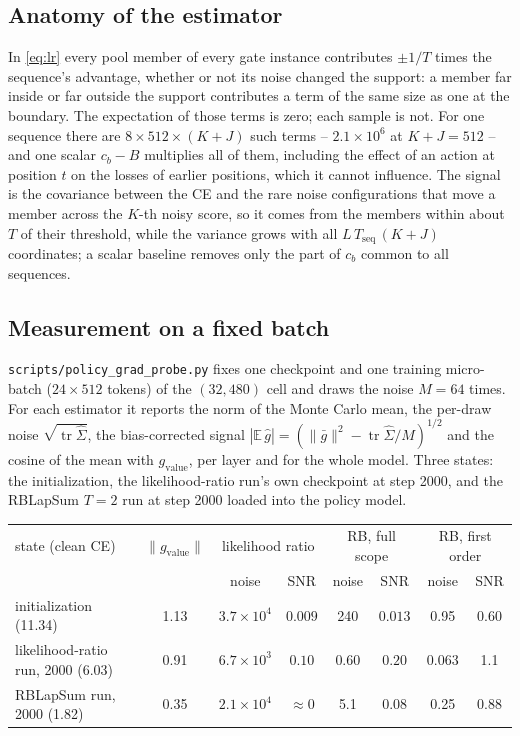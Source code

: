 \documentclass[11pt,a4paper]{article}
\newcommand{\code}[1]{\texttt{#1}}
\begin{document}
\subsection*{Anatomy of the estimator}

In \eqref{eq:lr} every pool member of every gate instance contributes
$\pm 1/T$ times the sequence's advantage, whether or not its noise changed the
support: a member far inside or far outside the support contributes a term of
the same size as one at the boundary. The expectation of those terms is zero;
each sample is not. For one sequence there are $8 \times 512 \times (K{+}J)$
such terms -- $2.1 \times 10^6$ at $K{+}J = 512$ -- and one scalar
$c_b - B$ multiplies all of them, including the effect of an action at
position $t$ on the losses of earlier positions, which it cannot influence.
The signal is the covariance between the CE and the rare noise configurations
that move a member across the $K$-th noisy score, so it comes from the members
within about $T$ of their threshold, while the variance grows with all
$L\,T_{\mathrm{seq}}\,(K{+}J)$ coordinates; a scalar baseline removes only the
part of $c_b$ common to all sequences.

\subsection*{Measurement on a fixed batch}

\code{scripts/policy\_grad\_probe.py} fixes one checkpoint and one training
micro-batch ($24 \times 512$ tokens) of the $(32, 480)$ cell and draws the
noise $M = 64$ times. For each estimator it reports the norm of the Monte Carlo
mean, the per-draw noise $\sqrt{\operatorname{tr}\widehat\Sigma}$, the
bias-corrected signal $|\mathbb E\,\hat g| = (\|\bar g\|^2 -
\operatorname{tr}\widehat\Sigma / M)^{1/2}$ and the cosine of the mean with
$g_{\mathrm{value}}$, per layer and for the whole model. Three states: the
initialization, the likelihood-ratio run's own checkpoint at step 2000, and the
RBLapSum $T=2$ run at step 2000 loaded into the policy model.

\begin{center}\small
\begin{tabular}{lccccccc}
\toprule
state (clean CE) & $\|g_{\mathrm{value}}\|$ & \multicolumn{2}{c}{likelihood ratio} &
\multicolumn{2}{c}{RB, full scope} & \multicolumn{2}{c}{RB, first order} \\
 & & noise & SNR & noise & SNR & noise & SNR \\
\midrule
initialization (11.34)        & 1.13  & $3.7 \times 10^4$ & $0.009$ & 240  & $0.013$ & 0.95  & 0.60 \\
likelihood-ratio run, 2000 (6.03) & 0.91  & $6.7 \times 10^3$ & $0.10$  & 0.60 & $0.20$  & 0.063 & 1.1 \\
RBLapSum run, 2000 (1.82)     & 0.35  & $2.1 \times 10^4$ & $\approx 0$ & 5.1  & $0.08$  & 0.25  & 0.88 \\
\bottomrule
\end{tabular}
\end{center}
\end{document}
